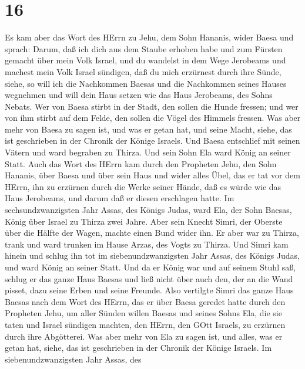 \hypertarget{section-15}{%
\section{16}\label{section-15}}

 Es kam aber das Wort des HErrn zu Jehu, dem Sohn Hananis,
wider Baesa und sprach:  Darum, daß ich dich aus dem Staube
erhoben habe und zum Fürsten gemacht über mein Volk Israel, und du
wandelst in dem Wege Jerobeams und machest mein Volk Israel sündigen,
daß du mich erzürnest durch ihre Sünde,  siehe, so will ich
die Nachkommen Baesas und die Nachkommen seines Hauses wegnehmen und
will dein Haus setzen wie das Haus Jerobeams, des Sohns Nebats.
 Wer von Baesa stirbt in der Stadt, den sollen die Hunde
fressen; und wer von ihm stirbt auf dem Felde, den sollen die Vögel des
Himmels fressen.  Was aber mehr von Baesa zu sagen ist, und
was er getan hat, und seine Macht, siehe, das ist geschrieben in der
Chronik der Könige Israels.  Und Baesa entschlief mit seinen
Vätern und ward begraben zu Thirza. Und sein Sohn Ela ward König an
seiner Statt.  Auch das Wort des HErrn kam durch den
Propheten Jehu, den Sohn Hananis, über Baesa und über sein Haus und
wider alles Übel, das er tat vor dem HErrn, ihn zu erzürnen durch die
Werke seiner Hände, daß es würde wie das Haus Jerobeams, und darum daß
er diesen erschlagen hatte.  Im sechsundzwanzigsten Jahr
Assas, des Königs Judas, ward Ela, der Sohn Baesas, König über Israel zu
Thirza zwei Jahre.  Aber sein Knecht Simri, der Oberste über
die Hälfte der Wagen, machte einen Bund wider ihn. Er aber war zu
Thirza, trank und ward trunken im Hause Arzas, des Vogts zu Thirza.
 Und Simri kam hinein und schlug ihn tot im
siebenundzwanzigsten Jahr Assas, des Königs Judas, und ward König an
seiner Statt.  Und da er König war und auf seinem Stuhl
saß, schlug er das ganze Haus Baesas und ließ nicht über auch den, der
an die Wand pisset, dazu seine Erben und seine Freunde. 
Also vertilgte Simri das ganze Haus Baesas nach dem Wort des HErrn, das
er über Baesa geredet hatte durch den Propheten Jehu,  um
aller Sünden willen Baesas und seines Sohns Ela, die sie taten und
Israel sündigen machten, den HErrn, den GOtt Israels, zu erzürnen durch
ihre Abgötterei.  Was aber mehr von Ela zu sagen ist, und
alles, was er getan hat, siehe, das ist geschrieben in der Chronik der
Könige Israels.  Im siebenundzwanzigsten Jahr Assas, des
